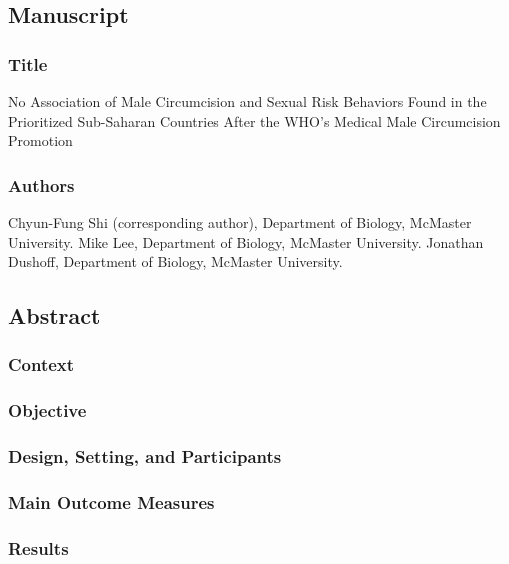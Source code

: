 \documentclass[12pt,]{article}
\date{}
\begin{document}
\subsection{Manuscript}\label{manuscript}

\subsubsection{Title}\label{title}

No Association of Male Circumcision and Sexual Risk Behaviors Found in
the Prioritized Sub-Saharan Countries After the WHO's Medical Male
Circumcision Promotion

\subsubsection{Authors}\label{authors}

Chyun-Fung Shi (corresponding author), Department of Biology, McMaster
University. Mike Lee, Department of Biology, McMaster University.
Jonathan Dushoff, Department of Biology, McMaster
University.

\subsection{Abstract}\label{abstract}

\subsubsection{Context}\label{context}

\subsubsection{Objective}\label{objective}

\subsubsection{Design, Setting, and
Participants}\label{design-setting-and-participants}

\subsubsection{Main Outcome Measures}\label{main-outcome-measures}

\subsubsection{Results}\label{results}
\end{document}

